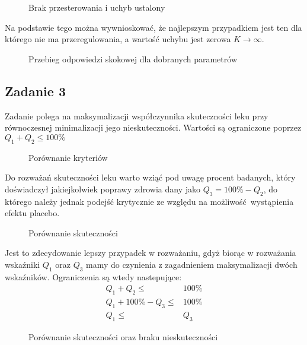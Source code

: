 \documentclass[a4paper, 12pt]{article}
\begin{document}
            \begin{figure}[H]
                \centering
                \def \svgwidth{0.7\columnwidth}
                
                \caption{Brak przesterowania i uchyb ustalony}
            \end{figure}\noindent
            Na podstawie tego można wywnioskować, że najlepszym przypadkiem jest ten dla którego nie ma 
            przeregulowania, a wartość uchybu jest zerowa $K \to \infty$.
            \begin{figure}[H]
                \centering
                \def \svgwidth{0.7\columnwidth}
                
                \caption{Przebieg odpowiedzi skokowej dla dobranych parametrów}
            \end{figure}\noindent
        \subsection{Zadanie 3}
            Zadanie polega na maksymalizacji współczynnika skuteczności leku przy równoczesnej
            minimalizacji jego nieskuteczności. Wartości są ograniczone poprzez $Q_1 + Q_2 \leq 100\%$
            \begin{figure}[H]
                \centering
                \def \svgwidth{0.7\columnwidth}
                
                \caption{Porównanie kryteriów}
            \end{figure}\noindent
            Do rozważań skuteczności leku warto wziąć pod uwagę procent badanych, który doświadczył
            jakiejkolwiek poprawy zdrowia dany jako $Q_3 = 100\% - Q_2$, do którego należy jednak 
            podejść krytycznie ze względu na możliwość wystąpienia efektu placebo.
            \begin{figure}[H]
                \centering
                \def \svgwidth{0.7\columnwidth}
                
                \caption{Porównanie skuteczności}
            \end{figure}\noindent
            Jest to zdecydowanie lepszy przypadek w rozważaniu, gdyż biorąc w rozważania wskaźniki $Q_1$
            oraz $Q_3$ mamy do czynienia z zagadnieniem maksymalizacji dwóch wskaźników. Ograniczenia są
            wtedy nastepujące:
            $$
                \begin{aligned}
                    Q_1 + Q_2 \leq& 100\% \\
                    Q_1 + 100\% - Q_3 \leq& 100\% \\
                    Q_1 \leq& Q_3
                \end{aligned}
            $$
            \begin{figure}[H]
                \centering
                \def \svgwidth{0.7\columnwidth}
                
                \caption{Porównanie skuteczności oraz braku nieskuteczności}
            \end{figure}\noindent
\end{document}
